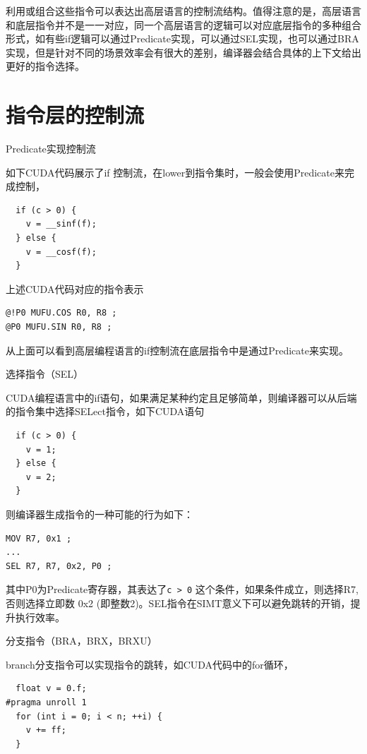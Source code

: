 利用或组合这些指令可以表达出高层语言的控制流结构。值得注意的是，高层语言和底层指令并不是一一对应，同一个高层语言的逻辑可以对应底层指令的多种组合形式，如有些if逻辑可以通过Predicate实现，可以通过SEL实现，也可以通过BRA实现，但是针对不同的场景效率会有很大的差别，编译器会结合具体的上下文给出更好的指令选择。

\section{指令层的控制流}

Predicate实现控制流

如下CUDA代码展示了if 控制流，在lower到指令集时，一般会使用Predicate来完成控制，

\begin{lstlisting}
  if (c > 0) {
    v = __sinf(f);
  } else {
    v = __cosf(f);
  }
\end{lstlisting}

上述CUDA代码对应的指令表示

\begin{lstlisting}
@!P0 MUFU.COS R0, R8 ;
@P0 MUFU.SIN R0, R8 ;
\end{lstlisting}

从上面可以看到高层编程语言的if控制流在底层指令中是通过Predicate来实现。

选择指令（SEL）

CUDA编程语言中的if语句，如果满足某种约定且足够简单，则编译器可以从后端的指令集中选择SELect指令，如下CUDA语句

\begin{lstlisting}
  if (c > 0) {
    v = 1;
  } else {
    v = 2;
  }
\end{lstlisting}

则编译器生成指令的一种可能的行为如下：

\begin{lstlisting}
MOV R7, 0x1 ;
...
SEL R7, R7, 0x2, P0 ;
\end{lstlisting}

其中P0为Predicate寄存器，其表达了\lstinline|c > 0| 这个条件，如果条件成立，则选择R7, 否则选择立即数 0x2 (即整数2)。SEL指令在SIMT意义下可以避免跳转的开销，提升执行效率。

分支指令（BRA，BRX，BRXU）

branch分支指令可以实现指令的跳转，如CUDA代码中的for循环，

\begin{lstlisting}
  float v = 0.f;
#pragma unroll 1
  for (int i = 0; i < n; ++i) {
    v += ff;
  }
\end{lstlisting}

